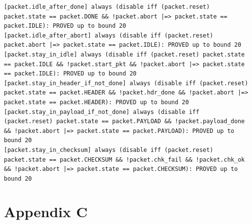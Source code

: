 \documentclass{article}
\begin{document}
\begin{lstlisting}
[packet.idle_after_done] always (disable iff (packet.reset) packet.state == packet.DONE && !packet.abort |=> packet.state == packet.IDLE): PROVED up to bound 20
[packet.idle_after_abort] always (disable iff (packet.reset) packet.abort |=> packet.state == packet.IDLE): PROVED up to bound 20
[packet.stay_in_idle] always (disable iff (packet.reset) packet.state == packet.IDLE && !packet.start_pkt && !packet.abort |=> packet.state == packet.IDLE): PROVED up to bound 20
[packet.stay_in_header_if_not_done] always (disable iff (packet.reset) packet.state == packet.HEADER && !packet.hdr_done && !packet.abort |=> packet.state == packet.HEADER): PROVED up to bound 20
[packet.stay_in_payload_if_not_done] always (disable iff (packet.reset) packet.state == packet.PAYLOAD && !packet.payload_done && !packet.abort |=> packet.state == packet.PAYLOAD): PROVED up to bound 20
[packet.stay_in_checksum] always (disable iff (packet.reset) packet.state == packet.CHECKSUM && !packet.chk_fail && !packet.chk_ok && !packet.abort |=> packet.state == packet.CHECKSUM): PROVED up to bound 20
\end{lstlisting}

\section{Appendix C} \label{sec:appc}
\end{document}
